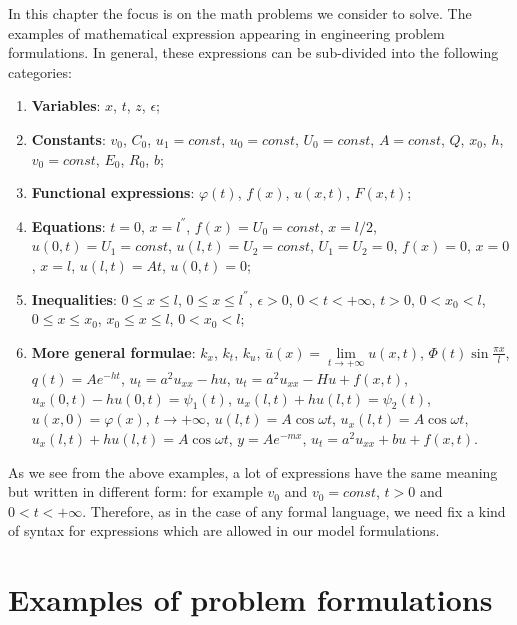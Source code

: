 In this chapter the focus is on the math problems we consider to solve. The examples of mathematical expression appearing in engineering problem formulations. In general, these expressions can be sub-divided into the following categories:
\begin{enumerate}
\item {\bfseries Variables}: $x$, $t$, $z$, $\epsilon$;
\item {\bfseries Constants}: $v_{0}$, $C_{0}$, $u_{1}=const$, $u_{0}=const$, $U_{0}=const$, $A=const$, $Q$, $x_{0}$, $h$,  $v_{0}=const$, $E_{0}$, $R_{0}$, $b$;
\item {\bfseries Functional expressions}: $\varphi(t)$, $f(x)$, $u(x,t)$, $F(x,t)$;
\item {\bfseries Equations}: $t=0$, $x=l^{''}$, $f(x)=U_{0}=const$, $x=l/2$, $u(0,t)=U_{1}=const$, $u(l,t)=U_{2}=const$, $U_{1}=U_{2}=0$, $f(x)=0$, $x=0$, $x=l$, $u(l,t)=At$, $u(0,t)=0$;
\item {\bfseries Inequalities}: $0\leq x \leq l$, $0\leq x \leq l^{''}$, $\epsilon >0$, $0<t<+ \infty$, $t>0$, $0<x_{0}<l$, $0\leq x\leq x_{0}$, $x_{0}\leq x \leq l$, $0<x_{0}<l$;
\item {\bfseries More general formulae}: $k_{x}$, $k_{t}$, $k_{u}$, $\bar{u}(x)=\lim\limits_{t\to +\infty} u(x,t)$, $\Phi (t)\sin \frac{\pi x}{l}$, $q(t)=Ae^{-ht}$, $u_{t}=a^{2}u_{xx}-hu$, $u_{t}=a^{2}u_{xx}-Hu+f(x,t)$, $u_{x}(0,t)-hu(0,t)=\psi_{1}(t)$, $u_{x}(l,t)+hu(l,t)=\psi_{2}(t)$, $u(x,0)=\varphi (x)$, $t \to +\infty$, $u(l,t)=A \cos \omega t$, $u_{x}(l,t)=A \cos \omega t$, $u_{x}(l,t)+hu(l,t)=A \cos \omega t$, $y=Ae^{-mx}$, $u_{t}=a^{2}u_{xx}+bu+f(x,t)$.
\end{enumerate}
As we see from the above examples, a lot of expressions have the same meaning but written in different form: for example $v_{0}$ and $v_{0}=const$, $t>0$ and $0<t<+\infty$. Therefore, as in the case of any formal language, we need fix a kind of syntax for expressions which are allowed in our model formulations.\par

\section{Examples of problem formulations}

